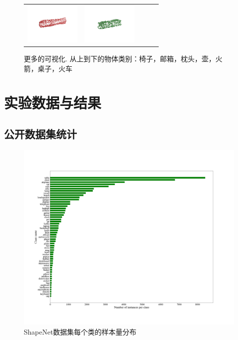 \documentclass[bachelor, nocolorlinks, printoneside]{seuthesis} %
\begin{document}
\begin{Appendix}{}
\begin{figure}[!h]
\begin{tabular}{c@{}c@{}c@{}c@{}c@{}}
            \includegraphics[width=0.18\columnwidth,height=2cm]{figs/supp_real_dataset/AE/train_537decdce3079c857addcf2661f94d39_pred.png} &
            \includegraphics[width=0.18\columnwidth,height=2cm]{figs/supp_real_dataset/oracle/train_537decdce3079c857addcf2661f94d39_oracle.png} \\
            \end{tabular}
            \caption{\small 更多的可视化. 从上到下的物体类别：椅子，邮箱，枕头，壶，火箭，桌子，火车}
            \label{fig:visualize_KC_supplementary}
        \end{figure}
        \clearpage

    \chapter{实验数据与结果}
    \section{公开数据集统计}
    \begin{figure}
        \centering
        \includegraphics[width=0.99\columnwidth]{figs/data_stats.png}
        \caption{ShapeNet数据集每个类的样本量分布}
        \label{fig:data-stats}
    \end{figure}
    
\end{Appendix}
\end{document}
